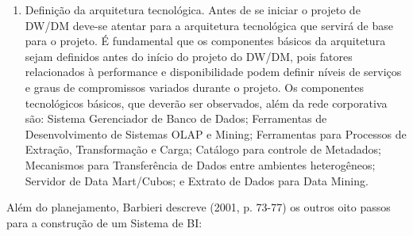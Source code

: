 \documentclass[a4paper]{article}
\begin{document}
\begin{enumerate}
{{em conformidade, o que significa que os elos entre os DM estar\~ao identificados e possibilitar\~ao as conex\~oes
futuras e integra\c{c}\~oes sem grandes traumas. }}
\item {
\textsf{Defini\c{c}\~ao da arquitetura tecnol\'ogica. Antes de se iniciar o projeto de DW/DM deve-se atentar para a
arquitetura tecnol\'ogica que servir\'a de base para o projeto. \'E fundamental que os componentes b\'asicos da
arquitetura sejam definidos antes do in\'icio do projeto do DW/DM, pois fatores relacionados \`a performance e
disponibilidade podem definir n\'iveis de servi\c{c}os e graus de compromissos variados durante o projeto. Os
componentes tecnol\'ogicos b\'asicos, que dever\~ao }\textsf{ser observados, al\'em da rede corporativa s\~ao: Sistema
Gerenciador de Banco de Dados; Ferramentas de Desenvolvimento de Sistemas OLAP e Mining; Ferramentas para Processos de
Extra\c{c}\~ao, Transforma\c{c}\~ao e Carga; Cat\'alogo para controle de Metadados; Mecanismos para Transfer\^encia de
Dados entre ambientes heterog\^eneos; Servidor de Data Mart/Cubos; e Extrato de Dados para Data Mining.}}
\end{enumerate}
{
\textsf{Al\'em do planejamento, Barbieri descreve (2001, p. 73-77) os outros oito passos para a constru\c{c}\~ao de um
Sistema de BI:}}
\end{document}
